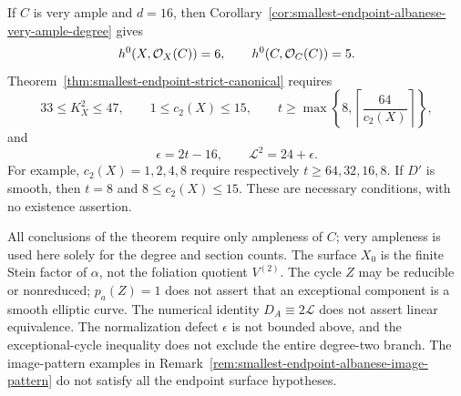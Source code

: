 \begin{remark}
\label{rem:smallest-endpoint-strict-degree-sixteen}
If $C$ is very ample and $d=16$, then
Corollary~\ref{cor:smallest-endpoint-albanese-very-ample-degree}
gives
\[
 h^0(X,\mathcal O_X(C))=6,\qquad h^0(C,\mathcal O_C(C))=5.
\]
Theorem~\ref{thm:smallest-endpoint-strict-canonical} requires
\[
 33\le K_X^2\le47,\qquad 1\le c_2(X)\le15,\qquad
 t\ge\max\left\{8,\left\lceil\frac{64}{c_2(X)}\right\rceil\right\},
\]
and
\[
 \epsilon=2t-16,\qquad \mathcal L^2=24+\epsilon.
\]
For example, $c_2(X)=1,2,4,8$ require respectively
$t\ge64,32,16,8$.
If $D'$ is smooth, then $t=8$ and $8\le c_2(X)\le15$.
These are necessary conditions, with no existence assertion.

All conclusions of the theorem require only ampleness of $C$;
very ampleness is used here solely for the degree and section counts.
The surface $X_0$ is the finite Stein factor of $\alpha$,
not the foliation quotient $V^{(2)}$.
The cycle $Z$ may be reducible or nonreduced; $p_a(Z)=1$
does not assert that an exceptional component is a smooth elliptic
curve.
The numerical identity $D_A\equiv2\mathcal L$ does not assert
linear equivalence.
The normalization defect $\epsilon$ is not bounded above, and
the exceptional-cycle inequality does not exclude the entire
degree-two branch.
The image-pattern examples in
Remark~\ref{rem:smallest-endpoint-albanese-image-pattern}
do not satisfy all the endpoint surface hypotheses.
\end{remark}
